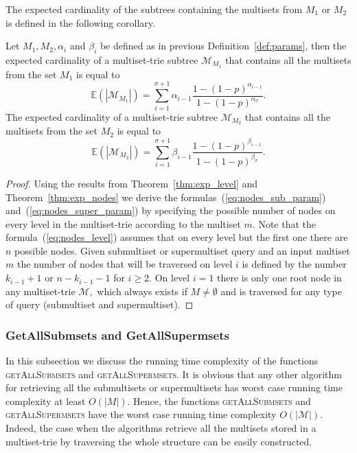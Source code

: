 The expected cardinality of the subtrees containing the multisets from $M_1$ or $M_2$ 
is defined in the following corollary.

\begin{corollary}\label{cor:exp_nodes_param}
Let $M_1, M_2, \alpha_i$ and $\beta_i$ be defined as in previous Definition~\ref{def:params}, 
then the expected cardinality of a multiset-trie subtree $\mathcal{M}_{M_1}$ that contains all the multisets 
from the set $M_1$ is equal to 
\begin{equation}\label{eq:nodes_sub_param}
\mathbb{E}( |\mathcal{M}_{M_1}| ) = \sum_{i=1}^{\sigma + 1} \alpha_{i-1} \frac{1-(1-p)^{\alpha_{i-1}}}{1-(1-p)^{\alpha_{\sigma}}}.
\end{equation}
The expected cardinality of a multiset-trie subtree $\mathcal{M}_{M_2}$ that contains all the multisets 
from the set $M_2$ is equal to 
\begin{equation}\label{eq:nodes_super_param}
\mathbb{E}( |\mathcal{M}_{M_2}| ) = \sum_{i=1}^{\sigma + 1} \beta_{i-1} \frac{1-(1-p)^{\beta_{i-1}}}{1-(1-p)^{\beta_{\sigma}}}.
\end{equation}
\end{corollary}
%
\begin{proof}
Using the results from Theorem~\ref{thm:exp_level} and Theorem~\ref{thm:exp_nodes} 
we derive the formulas~(\cref{eq:nodes_sub_param}) and~(\cref{eq:nodes_super_param}) 
by specifying the possible number of nodes on every level in the multiset-trie according 
to the multiset $m.$ Note that the formula~(\cref{eq:nodes_level}) assumes that on every 
level but the first one there are $n$ possible nodes. Given submultiset or supermultiset 
query and an input multiset $m$ the number of nodes that will be traversed on level $i$ is 
defined by the number $k_{i-1}+1$ or $n-k_{i-1}-1$ for $i\geq 2.$ On level $i=1$ 
there is only one root node in any multiset-trie $\mathcal{M},$ which always exists 
if $M\neq\emptyset$ and is traversed for any type of query (submultiset and 
supermultiset).

\end{proof}

\subsubsection{GetAllSubmsets and GetAllSupermsets}\label{ss:getall}
In this subsection we discuss the running time complexity of the functions 
\textsc{getAllSubmsets} and \textsc{getAllSupermsets}. It is obvious that any 
other algorithm for retrieving all the submultisets or supermultisets has worst 
case running time complexity at least $O(|M|).$ Hence, the functions 
\textsc{getAllSubmsets} and \textsc{getAllSupermsets} have the worst case 
running time complexity $O(|\mathcal{M}|).$ Indeed, the case when the algorithms 
retrieve all the multisets stored in a multiset-trie by traversing the whole structure 
can be easily constructed. 

